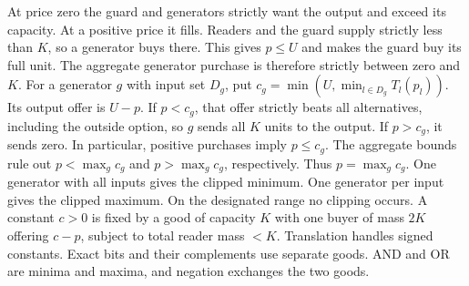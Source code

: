 \documentclass[11pt,oneside,openany,notitlepage]{report}
\begin{document}
At price zero the guard and generators strictly want the output and exceed
its capacity. At a positive price it fills. Readers and the guard supply
strictly less than \(K\), so a generator buys there. This gives \(p\le U\)
and makes the guard buy its full unit. The aggregate generator purchase
is therefore strictly between zero and \(K\).
For a generator \(g\) with input set \(D_g\), put
\(c_g=\min(U,\min_{l\in D_g}T_l(p_l))\). Its output offer is \(U-p\).
If \(p<c_g\), that offer strictly beats all alternatives, including the
outside option, so \(g\) sends all \(K\) units to the output. If \(p>c_g\), it sends zero. In particular, positive purchases imply \(p\le c_g\).
The aggregate bounds rule out \(p<\max_g c_g\) and \(p>\max_g c_g\),
respectively. Thus \(p=\max_g c_g\). One generator with all inputs gives
the clipped minimum. One generator per input gives the clipped maximum.
On the designated range no clipping occurs. A constant \(c>0\) is fixed
by a good of capacity \(K\) with one buyer of mass \(2K\) offering
\(c-p\), subject to total reader mass \(<K\). Translation handles signed
constants. Exact bits and their complements use separate goods. AND and
OR are minima and maxima, and negation exchanges the two goods.
\end{document}
